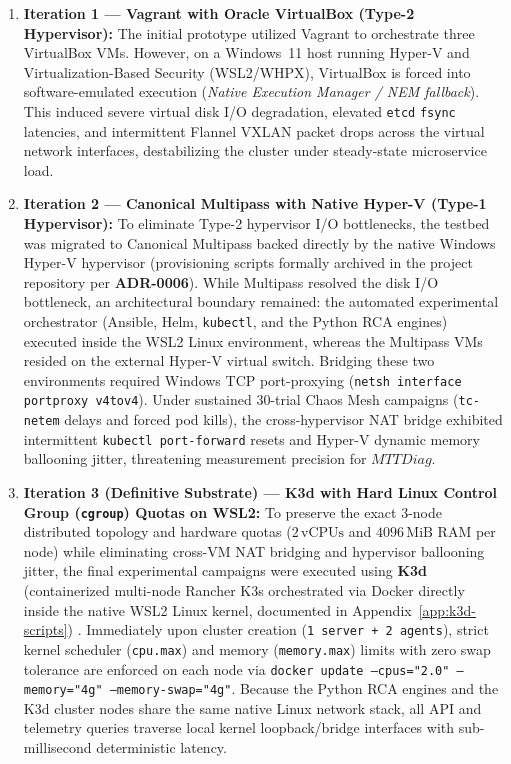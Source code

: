 \begin{enumerate}
    \item \textbf{Iteration 1 --- Vagrant with Oracle VirtualBox (Type-2 Hypervisor):} The initial prototype utilized Vagrant to orchestrate three VirtualBox VMs. However, on a Windows~11 host running Hyper-V and Virtualization-Based Security (WSL2/WHPX), VirtualBox is forced into software-emulated execution (\textit{Native Execution Manager / NEM fallback}). This induced severe virtual disk I/O degradation, elevated \texttt{etcd} \texttt{fsync} latencies, and intermittent Flannel VXLAN packet drops across the virtual network interfaces, destabilizing the cluster under steady-state microservice load.

    \item \textbf{Iteration 2 --- Canonical Multipass with Native Hyper-V (Type-1 Hypervisor):} To eliminate Type-2 hypervisor I/O bottlenecks, the testbed was migrated to Canonical Multipass backed directly by the native Windows Hyper-V hypervisor (provisioning scripts formally archived in the project repository per \textbf{ADR-0006}). While Multipass resolved the disk I/O bottleneck, an architectural boundary remained: the automated experimental orchestrator (Ansible, Helm, \texttt{kubectl}, and the Python RCA engines) executed inside the WSL2 Linux environment, whereas the Multipass VMs resided on the external Hyper-V virtual switch. Bridging these two environments required Windows TCP port-proxying (\texttt{netsh interface portproxy v4tov4}). Under sustained 30-trial Chaos Mesh campaigns (\texttt{tc-netem} delays and forced pod kills), the cross-hypervisor NAT bridge exhibited intermittent \texttt{kubectl port-forward} resets and Hyper-V dynamic memory ballooning jitter, threatening measurement precision for $MTTDiag$.

    \item \textbf{Iteration 3 (Definitive Substrate) --- K3d with Hard Linux Control Group (\texttt{cgroup}) Quotas on WSL2:} To preserve the exact 3-node distributed topology and hardware quotas ($2\,\text{vCPUs}$ and $4096\,\text{MiB}$ RAM per node) while eliminating cross-VM NAT bridging and hypervisor ballooning jitter, the final experimental campaigns were executed using \textbf{K3d} (containerized multi-node Rancher K3s orchestrated via Docker directly inside the native WSL2 Linux kernel, documented in Appendix~\ref{app:k3d-scripts}) \cite{bernstein_2014}. Immediately upon cluster creation (\texttt{1 server + 2 agents}), strict kernel scheduler (\texttt{cpu.max}) and memory (\texttt{memory.max}) limits with zero swap tolerance are enforced on each node via \texttt{docker update --cpus="2.0" --memory="4g" --memory-swap="4g"}. Because the Python RCA engines and the K3d cluster nodes share the same native Linux network stack, all API and telemetry queries traverse local kernel loopback/bridge interfaces with sub-millisecond deterministic latency.
\end{enumerate}

